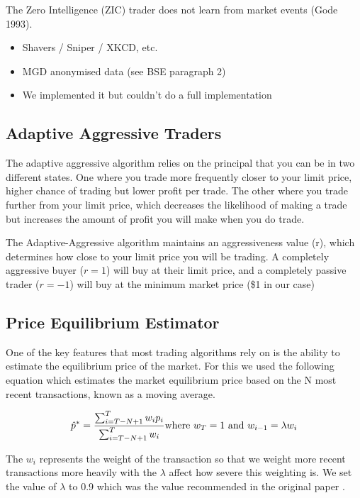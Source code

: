 \documentclass{acm_proc_article-sp}
\begin{document}

The Zero Intelligence (ZIC) trader does not learn from market events (Gode
1993).

\begin{itemize} \itemsep0pt
	\item Shavers / Sniper / XKCD, etc.
	\item MGD anonymised data (see BSE paragraph 2)
	\item We implemented it but couldn't do a full implementation
\end{itemize}

\pagebreak
\subsection{Adaptive Aggressive Traders} \label{sec:AA}
The adaptive aggressive algorithm relies on the principal that you can be in
two different states. One where you trade more frequently closer to your limit
price, higher chance of trading but lower profit per trade. The other where you
trade further from your limit price, which decreases the likelihood of making a
trade but increases the amount of profit you will make when you do trade.

The Adaptive-Aggressive algorithm maintains an aggressiveness value (r), which
determines how close to your limit price you will be trading. A completely
aggressive buyer ($r = 1$) will buy at their limit price, and a completely
passive trader ($r = -1$) will buy at the minimum market price (\$1 in our case)
\subsection{Price Equilibrium Estimator}
One of the key features that most trading algorithms rely on is the ability to
estimate the equilibrium price of the market. For this we used the following
equation which estimates the market equilibrium price based on the N most
recent transactions, known as a moving average.

\begin{equation}
\hat p^* = \frac{\sum^T_{i=T-N+1}w_ip_i}{\sum^T_{i=T-N+1}w_i}\\
\text{where $w_T = 1$ and $w_{i-1} = \lambda w_i$}
\label{equest}
\end{equation}

The $w_i$ represents the weight of the transaction so that we weight more
recent transactions more heavily with the $\lambda$ affect how severe this
weighting is. We set the value of $\lambda$ to 0.9 which was the value
recommended in the original paper \cite[p.~100]{AA_thesis}.\\
\end{document}
